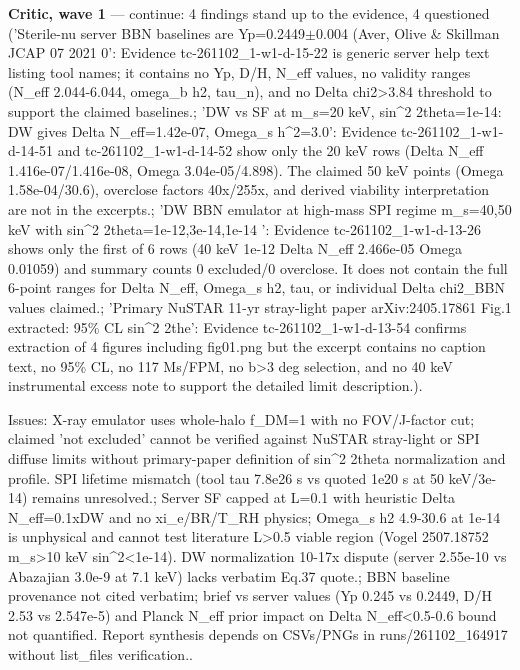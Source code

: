 \documentclass[11pt,a4paper]{article}
\begin{document}
\textbf{Critic, wave 1} --- continue: 4 findings stand up to the evidence, 4 questioned ('Sterile-nu server BBN baselines are Yp=0.2449$\pm$0.004 (Aver, Olive \& Skillman JCAP 07 2021 0': Evidence tc-261102\_1-w1-d-15-22 is generic server help text listing tool names; it contains no Yp, D/H, N\_eff values, no validity ranges (N\_eff 2.044-6.044, omega\_b h2, tau\_n), and no Delta chi2\textgreater{}3.84 threshold to support the claimed baselines.; 'DW vs SF at m\_s=20 keV, sin\textasciicircum{}2 2theta=1e-14: DW gives Delta N\_eff=1.42e-07, Omega\_s h\textasciicircum{}2=3.0': Evidence tc-261102\_1-w1-d-14-51 and tc-261102\_1-w1-d-14-52 show only the 20 keV rows (Delta N\_eff 1.416e-07/1.416e-08, Omega 3.04e-05/4.898). The claimed 50 keV points (Omega 1.58e-04/30.6), overclose factors 40x/255x, and derived viability interpretation are not in the excerpts.; 'DW BBN emulator at high-mass SPI regime m\_s=40,50 keV with sin\textasciicircum{}2 2theta=1e-12,3e-14,1e-14 ': Evidence tc-261102\_1-w1-d-13-26 shows only the first of 6 rows (40 keV 1e-12 Delta N\_eff 2.466e-05 Omega 0.01059) and summary counts 0 excluded/0 overclose. It does not contain the full 6-point ranges for Delta N\_eff, Omega\_s h2, tau, or individual Delta chi2\_BBN values claimed.; 'Primary NuSTAR 11-yr stray-light paper arXiv:2405.17861 Fig.1 extracted: 95\% CL sin\textasciicircum{}2 2the': Evidence tc-261102\_1-w1-d-13-54 confirms extraction of 4 figures including fig01.png but the excerpt contains no caption text, no 95\% CL, no 117 Ms/FPM, no \textbar{}b\textbar{}\textgreater{}3 deg selection, and no 40 keV instrumental excess note to support the detailed limit description.).

Issues: X-ray emulator uses whole-halo f\_DM=1 with no FOV/J-factor cut; claimed 'not excluded' cannot be verified against NuSTAR stray-light or SPI diffuse limits without primary-paper definition of sin\textasciicircum{}2 2theta normalization and profile. SPI lifetime mismatch (tool tau 7.8e26 s vs quoted 1e20 s at 50 keV/3e-14) remains unresolved.; Server SF capped at L=0.1 with heuristic Delta N\_eff=0.1xDW and no xi\_e/BR/T\_RH physics; Omega\_s h2 4.9-30.6 at 1e-14 is unphysical and cannot test literature L\textgreater{}0.5 viable region (Vogel 2507.18752 m\_s\textgreater{}10 keV sin\textasciicircum{}2\textless{}1e-14). DW normalization 10-17x dispute (server 2.55e-10 vs Abazajian 3.0e-9 at 7.1 keV) lacks verbatim Eq.37 quote.; BBN baseline provenance not cited verbatim; brief vs server values (Yp 0.245 vs 0.2449, D/H 2.53 vs 2.547e-5) and Planck N\_eff prior impact on Delta N\_eff\textless{}0.5-0.6 bound not quantified. Report synthesis depends on CSVs/PNGs in runs/261102\_164917 without list\_files verification..
\end{document}
